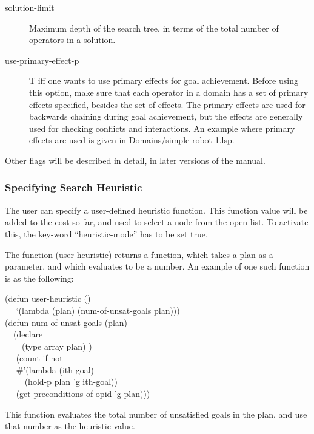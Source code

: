\begin{description}
\item[solution-limit]  Maximum depth of the search tree, in terms of
the total number of operators in a solution.

\item[use-primary-effect-p] T iff one wants to use primary effects for
goal achievement.  Before using this option, make sure that each
operator in a domain has a set of primary effects specified, besides
the set of effects.  The primary effects are used for backwards
chaining during goal achievement, but the effects are generally used
for checking conflicts and interactions.  An example where primary
effects are used is given in Domains/simple-robot-1.lsp.


\item[Other flags will be described in detail, in later versions of
the manual.]
\end{description}



\subsubsection{Specifying Search Heuristic}
The user can specify a user-defined heuristic function.  This function
value will be added to the cost-so-far, and used to select a node from
the open list.  To activate this, the key-word ``heuristic-mode'' has
to be set true.

The function (user-heuristic) returns a function, which takes a plan
as a parameter, and which evaluates to be a number.  An example of one
such function is as the following:
\begin{tabbing}
(defun {\rm user-heuristic} () \\
~~ `(lambda (plan) ({\rm num-of-unsat-goals} plan)))\\

(defun {\rm num-of-unsat-goals} (plan)\\
~~(declare \\
~~~~(type array plan) )\\
~~  (count-if-not\\
~~  \#'(lambda (ith-goal)\\
~~~~       (hold-p plan 'g ith-goal))\\
~~   (get-preconditions-of-opid 'g plan)))
\end{tabbing}
This function evaluates the total number of unsatisfied goals in the
plan, and use that number as the heuristic value.

